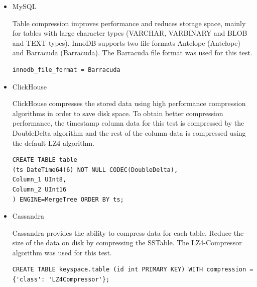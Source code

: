 \begin{itemize}
\item MySQL
    
Table compression improves performance and reduces storage space, mainly for tables with large character types (VARCHAR, VARBINARY and BLOB and TEXT types). InnoDB supports two file formats Antelope (Antelope) and Barracuda (Barracuda). The Barracuda file format was used for this test.

\begin{verbatim}
innodb_file_format = Barracuda
\end{verbatim}

\item ClickHouse

ClickHouse compresses the stored data using high performance compression algorithms in order to save disk space. To obtain better compression performance, the timestamp column data for this test is compressed by the DoubleDelta algorithm and the rest of the column data is compressed using the default LZ4 algorithm.

\begin{verbatim}
CREATE TABLE table
(ts DateTime64(6) NOT NULL CODEC(DoubleDelta),
Column_1 UInt8,
Column_2 UInt16
) ENGINE=MergeTree ORDER BY ts;
\end{verbatim}

\item Cassandra

Cassandra provides the ability to compress data for each table. Reduce the size of the data on disk by compressing the SSTable. The LZ4-Compressor algorithm was used for this test.

\begin{verbatim}
CREATE TABLE keyspace.table (id int PRIMARY KEY) WITH compression = {'class': 'LZ4Compressor'};
\end{verbatim}

\end{itemize}

